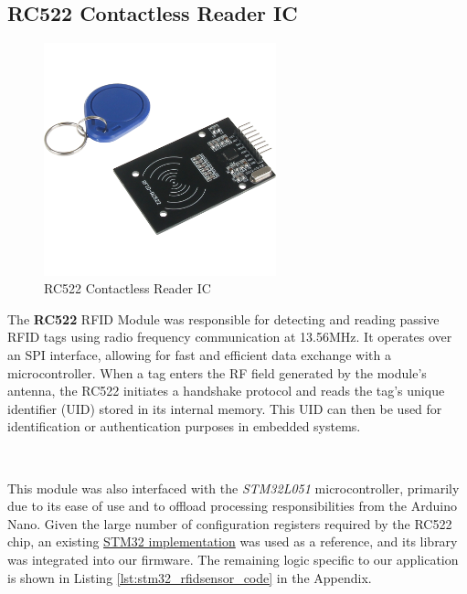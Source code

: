 \documentclass{article}
\begin{document}
\subsection{RC522 Contactless Reader IC}
\label{sec:rfidsensor}
\begin{figure}[H]
    \centering
    \includegraphics[width=0.6\textwidth]{Figures/rfidsensor.png} %
    \caption{RC522 Contactless Reader IC}
    \label{fig:rfidsensor}


\end{figure}

The \textbf{RC522} RFID Module was responsible for detecting and reading passive RFID tags using radio frequency communication at 13.56MHz. It operates over an SPI interface, allowing for fast and efficient data exchange with a microcontroller. When a tag enters the RF field generated by the module’s antenna, the RC522 initiates a handshake protocol and reads the tag’s unique identifier (UID) stored in its internal memory. This UID can then be used for identification or authentication purposes in embedded systems.

\

This module was also interfaced with the \emph{STM32L051} microcontroller, primarily due to its ease of use and to offload processing responsibilities from the Arduino Nano. Given the large number of configuration registers required by the RC522 chip, an existing \href{https://github.com/Hamid-R-Tanhaei/RFID-MIFARE-RC522-ARM-STM32/blob/main/Firmware_stm32f103zct6/Src/MFRC522.c}{STM32 implementation} was used as a reference, and its library was integrated into our firmware. The remaining logic specific to our application is shown in Listing \ref{lst:stm32_rfidsensor_code} in the Appendix.
\end{document}
